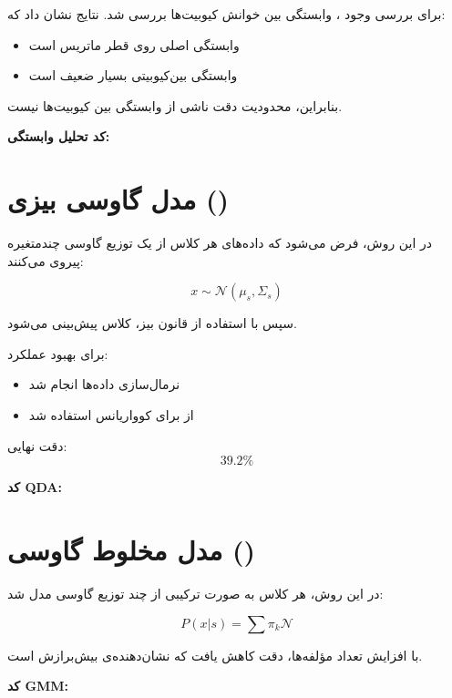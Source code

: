 برای بررسی وجود ، وابستگی بین خوانش کیوبیت‌ها بررسی شد. نتایج نشان داد که:

\begin{itemize}
	\item وابستگی اصلی روی قطر ماتریس است
	\item وابستگی بین‌کیوبیتی بسیار ضعیف است
\end{itemize}

بنابراین، محدودیت دقت ناشی از وابستگی بین کیوبیت‌ها نیست.

\textbf{کد تحلیل وابستگی:}


\section{مدل گاوسی بیزی ()}

در این روش، فرض می‌شود که داده‌های هر کلاس از یک توزیع گاوسی چندمتغیره پیروی می‌کنند:

\[
x \sim \mathcal{N}(\mu_s, \Sigma_s)
\]

سپس با استفاده از قانون بیز، کلاس پیش‌بینی می‌شود.

برای بهبود عملکرد:
\begin{itemize}
	\item نرمال‌سازی داده‌ها انجام شد
	\item از  برای کوواریانس استفاده شد
\end{itemize}

دقت نهایی:
\[
39.2\%
\]

\textbf{کد QDA:}


\section{مدل مخلوط گاوسی ()}

در این روش، هر کلاس به صورت ترکیبی از چند توزیع گاوسی مدل شد:

\[
P(x|s) = \sum \pi_k \mathcal{N}
\]

با افزایش تعداد مؤلفه‌ها، دقت کاهش یافت که نشان‌دهنده‌ی بیش‌برازش است.

\textbf{کد GMM:}


